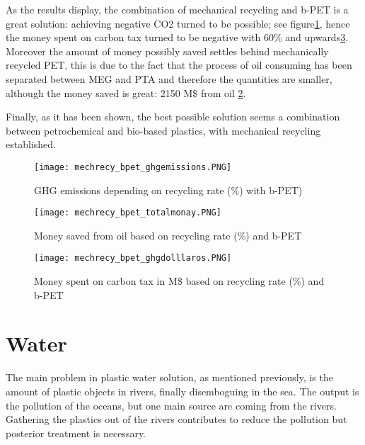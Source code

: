 \documentclass[twoside,a4paper,12pt]{report}
\begin{document}
As the results display, the combination of mechanical recycling and b-PET is a great solution: achieving negative CO2 turned to be possible; see figure\ref{graph_bpetmechryghgemissionssavedb}, hence the money spent on carbon tax turned to be negative with 60\% and upwards\ref{graph_bpetmmechrecmoneyco2}. Moreover the amount of money possibly saved settles behind mechanically recycled PET, this is due to the fact that the process of oil consuming has been separated between MEG and PTA and therefore the quantities are smaller, although the money saved is great: 2150 M\$ from oil \ref{graph_bpetmechryssavingsoil}.

Finally, as it has been shown, the best possible solution seems a combination between petrochemical and bio-based plastics, with mechanical recycling established.



\begin{figure}
    \centering
    \texttt{[image: mechrecy\_bpet\_ghgemissions.PNG]}
    \caption{GHG emissions depending on recycling rate (\%) with b-PET)}
     \label{graph_bpetmechryghgemissionssavedb} 
\end{figure}

\begin{figure} %
    \centering
    \texttt{[image: mechrecy\_bpet\_totalmonay.PNG]}
    \caption{Money saved from oil based on recycling rate (\%) and b-PET}
     \label{graph_bpetmechryssavingsoil} 
\end{figure}

\begin{figure} %
    \centering
    \texttt{[image: mechrecy\_bpet\_ghgdolllaros.PNG]}
    \caption{Money spent on carbon tax in M\$ based on recycling rate (\%) and b-PET}
     \label{graph_bpetmmechrecmoneyco2} 
\end{figure}
\section{Water}
The main problem in plastic water solution, as mentioned previously, is the amount of plastic objects in rivers, finally disemboguing in the sea.
The output is the pollution of the oceans, but one main source are coming from the rivers. Gathering the plastics out of the rivers  contributes to reduce the pollution but posterior treatment is necessary.
\end{document}
